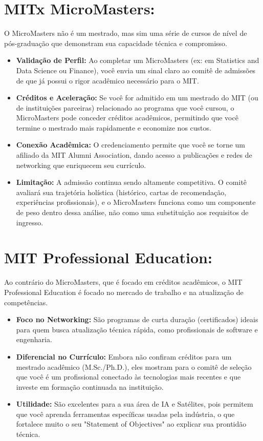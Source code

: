\documentclass{article}
\begin{document}
\section*{MITx MicroMasters:}
O MicroMasters não é um mestrado, mas sim uma série de cursos de nível de pós-graduação que demonstram sua capacidade técnica e compromisso.
\begin{itemize}
    \item \textbf{Validação de Perfil:} Ao completar um MicroMasters (ex: em Statistics and Data Science ou Finance), você envia um sinal claro ao comitê de admissões de que já possui o rigor acadêmico necessário para o MIT.
    \item \textbf{Créditos e Aceleração:} Se você for admitido em um mestrado do MIT (ou de instituições parceiras) relacionado ao programa que você cursou, o MicroMasters pode conceder créditos acadêmicos, permitindo que você termine o mestrado mais rapidamente e economize nos custos.
    \item \textbf{Conexão Acadêmica:} O credenciamento permite que você se torne um afiliado da MIT Alumni Association, dando acesso a publicações e redes de networking que enriquecem seu currículo.
    \item \textbf{Limitação:} A admissão continua sendo altamente competitiva. O comitê avaliará sua trajetória holística (histórico, cartas de recomendação, experiências profissionais), e o MicroMasters funciona como um componente de peso dentro dessa análise, não como uma substituição aos requisitos de ingresso.
\end{itemize}

\section*{MIT Professional Education:}
Ao contrário do MicroMasters, que é focado em créditos acadêmicos, o MIT Professional Education é focado no mercado de trabalho e na atualização de competências.
\begin{itemize}
    \item \textbf{Foco no Networking:} São programas de curta duração (certificados) ideais para quem busca atualização técnica rápida, como profissionais de software e engenharia.
    \item \textbf{Diferencial no Currículo:} Embora não confiram créditos para um mestrado acadêmico (M.Sc./Ph.D.), eles mostram para o comitê de seleção que você é um profissional conectado às tecnologias mais recentes e que investe em formação continuada na instituição.
    \item \textbf{Utilidade:} São excelentes para a sua área de IA e Satélites, pois permitem que você aprenda ferramentas específicas usadas pela indústria, o que fortalece muito o seu "Statement of Objectives" ao explicar sua prontidão técnica.
\end{itemize}
\end{document}
